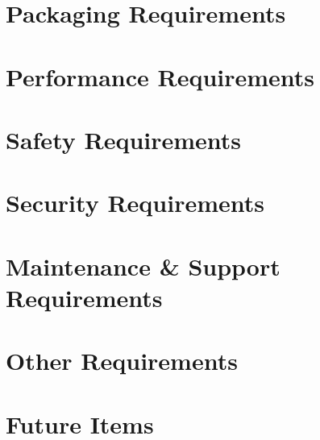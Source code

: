 \documentclass[11pt,letterpaper]{article}
\begin{document}
\section{Packaging Requirements}

\newpage
\section{Performance Requirements}

\newpage
\section{Safety Requirements}

\newpage
\section{Security Requirements}

\newpage
\section{Maintenance \& Support Requirements}

\newpage
\section{Other Requirements}

\newpage
\section{Future Items}

\newpage

\nocite{Rubin2012}

{}
\end{document}
